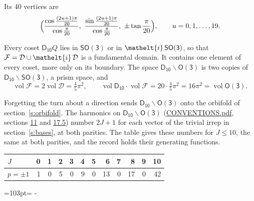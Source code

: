 \documentclass[10pt,a4paper]{article}
\newcommand{\needspace}[1]{\par\penalty-100\begingroup\dimen0=#1\relax\dimen2=\pagegoal
  \advance\dimen2-\pagetotal\ifdim\dimen0>\dimen2\relax\ifdim\dimen2>0pt\vfil\break\fi\fi
  \endgroup}
\numberwithin{equation}{section}
\newcommand{\eltfont}[1]{{\let\sigma\eltsigma\mathelt{#1}}}
\newcommand{\grp}[1]{\mathsf{#1}}
\newcommand{\elt}[1]{\eltfont{#1}}
\newcommand{\vol}{\operatorname{vol}}
\newcommand{\fcell}{\mathcal{D}}
\newcommand{\fdomain}{\mathcal{F}}
\begin{document}
\leavevmode\label{n:local.vertex.u}Its 40 vertices are
\begin{equation}\label{e:prism}\Bigl(\frac{\cos\frac{(2u+1)\pi}{20}}{\cos\frac{\pi}{20}},\ \frac{\sin\frac{(2u+1)\pi}{20}}{\cos\frac{\pi}{20}},\ \pm\tan\frac{\pi}{20}\Bigr),\qquad u = 0, 1, \dots, 19.\end{equation}

\leavevmode\label{n:set.fundamental}Every coset $\grp{D_{10}}Q$ lies in \href{SO3.pdf}{$\grp{SO(3)}$} or in $\elt{i}\,\grp{SO(3)}$, so that $\fdomain = \fcell \cup \elt{i}\,\fcell$ is a fundamental domain. It contains one element of every coset, more only on its boundary.
The space $\grp{D_{10}}\backslash\grp{O(3)}$ is two copies of $\grp{D_{10}}\backslash\grp{SO(3)}$, a prism space, and
\begin{equation}\label{e:volume}\vol\fdomain = 2\vol\fcell = \tfrac{4}{5}\pi^2,\qquad \vol\grp{D_{10}}\cdot\vol\fdomain = 20\cdot \tfrac{4}{5}\pi^2 = 16\pi^2 = \vol\grp{O(3)}.\end{equation}

Forgetting the turn about a direction sends $\grp{D_{10}}\backslash\grp{O(3)}$ onto the orbifold of section~\ref{s:orbifold}.
The harmonics on $\grp{D_{10}}\backslash\grp{O(3)}$ (\href{../../CONVENTIONS.pdf}{CONVENTIONS.pdf}, sections \href{../../CONVENTIONS.pdf\#conv.11}{11} and \href{../../CONVENTIONS.pdf\#conv.17.5}{17.5}) number $2J + 1$ for each vector of the trivial irrep in section~\ref{s:bases}, at both parities. The table gives these numbers for $J \le 10$, the same at both parities, and the record holds their generating functions.
{\small\setlength{\tabcolsep}{4pt}\begin{longtable}{@{}lrrrrrrrrrrr@{}}\toprule
$J$ & 0 & 1 & 2 & 3 & 4 & 5 & 6 & 7 & 8 & 9 & 10\\\midrule\endhead
\bottomrule\endfoot\endlastfoot
$p = \pm 1$ & 1 & 0 & 5 & 0 & 9 & 0 & 13 & 0 & 17 & 0 & 42\\
\bottomrule\end{longtable}}
\needspace{103pt}
\end{document}
